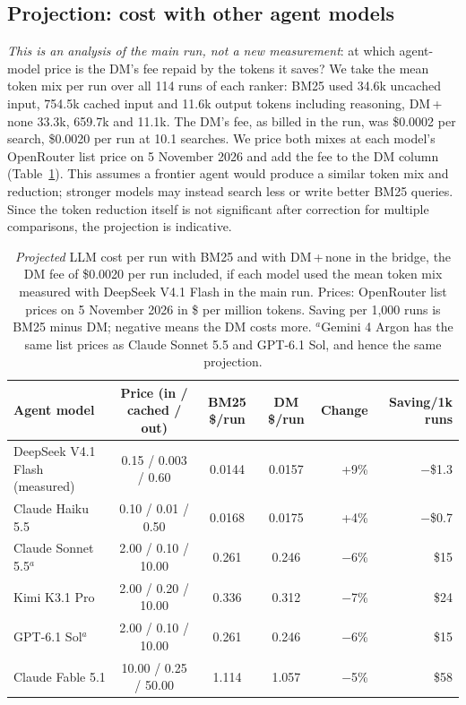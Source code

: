 \documentclass[11pt]{article}
\newcommand{\dmn}{DM\,+\,none}
\begin{document}
\subsection{Projection: cost with other agent models}\label{sec:projection}
\emph{This is an analysis of the main run, not a new measurement}: at which agent-model price is the DM's fee
repaid by the tokens it saves? We take the mean token mix per run over all 114 runs of each ranker: BM25 used
34.6k uncached input, 754.5k cached input and 11.6k output tokens including reasoning, \dmn{} 33.3k, 659.7k and
11.1k. The DM's fee, as billed in the run, was \$0.0002 per search, \$0.0020 per run at 10.1 searches. We price
both mixes at each model's OpenRouter list price on 5 November 2026 and add the fee to the DM column
(Table~\ref{tab:projection}). This assumes a frontier agent would produce a similar token mix and reduction;
stronger models may instead search less or write better BM25 queries. Since the token reduction itself is not
significant after correction for multiple comparisons, the projection is indicative.

\begin{table}[t]
\centering\small
\caption{\emph{Projected} LLM cost per run with BM25 and with \dmn{} in the bridge, the DM fee of \$0.0020 per run
included, if each model used the mean token mix measured with DeepSeek V4.1 Flash in the main run. Prices:
OpenRouter list prices on 5 November 2026 in \$ per million tokens. Saving per 1{,}000 runs is BM25 minus DM;
negative means the DM costs more. $^{a}$Gemini 4 Argon has the same list prices as Claude Sonnet 5.5 and GPT-6.1
Sol, and hence the same projection.}
\label{tab:projection}
\setlength{\tabcolsep}{3.5pt}\footnotesize
\begin{tabular}{@{}lcccrr@{}}
\toprule
Agent model & Price (in / cached / out) & BM25 \$/run & DM \$/run & Change & Saving/1k runs \\
\midrule
DeepSeek V4.1 Flash (measured) & 0.15 / 0.003 / 0.60 & 0.0144 & 0.0157 & +9\% & $-$\$1.3 \\
Claude Haiku 5.5 & 0.10 / 0.01 / 0.50 & 0.0168 & 0.0175 & +4\% & $-$\$0.7 \\
Claude Sonnet 5.5$^{a}$ & 2.00 / 0.10 / 10.00 & 0.261 & 0.246 & $-$6\% & \$15 \\
Kimi K3.1 Pro & 2.00 / 0.20 / 10.00 & 0.336 & 0.312 & $-$7\% & \$24 \\
GPT-6.1 Sol$^{a}$ & 2.00 / 0.10 / 10.00 & 0.261 & 0.246 & $-$6\% & \$15 \\
Claude Fable 5.1 & 10.00 / 0.25 / 50.00 & 1.114 & 1.057 & $-$5\% & \$58 \\
\bottomrule
\end{tabular}
\end{table}
\end{document}
